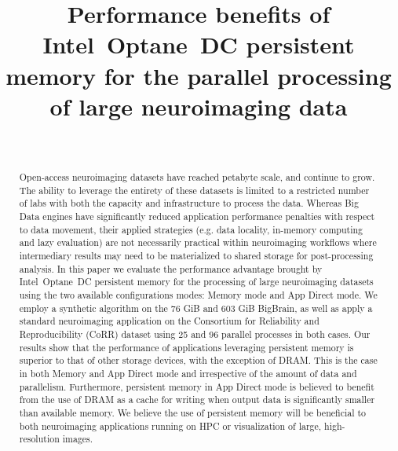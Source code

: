 \documentclass[conference]{IEEEtran}
\begin{document}
\title{Performance benefits of Intel\textsuperscript{\textregistered}~Optane\texttrademark~DC persistent memory for the parallel processing of large neuroimaging data}

\author{\\
}
\maketitle

\begin{abstract}
    Open-access neuroimaging datasets have reached petabyte scale, and continue to grow.
The ability to leverage the entirety of these datasets is limited to a restricted
number of labs with both the capacity and infrastructure to
process the data. Whereas Big Data engines have significantly
reduced application performance penalties with respect to data
movement, their applied strategies (e.g. data locality, in-memory computing and lazy evaluation)
are not necessarily practical
within neuroimaging workflows where intermediary results may
need to be materialized to shared storage for post-processing
analysis. In this paper we evaluate the performance advantage
brought by Intel\textsuperscript{\textregistered}~Optane\texttrademark~DC persistent memory for the
processing of large neuroimaging datasets using the two available
configurations modes: Memory mode and App Direct mode. We
employ a synthetic algorithm on the 76 GiB and 603 GiB BigBrain, as well as apply a
standard neuroimaging application on the Consortium for Reliability
and Reproducibility (CoRR) dataset using 25 and 96 parallel
processes in both cases. Our results show that the performance of
applications leveraging persistent memory is superior to that of other
storage devices, with the exception of DRAM. This is the case
in both Memory and App Direct mode and irrespective of the
amount of data and parallelism. Furthermore, persistent memory in App
Direct mode is believed to benefit from the use of DRAM as
a cache for writing when output data is significantly
smaller than available memory. We believe the use of persistent memory
will be beneficial to both neuroimaging applications running on
HPC or visualization of large, high-resolution images.
\end{abstract}
\end{document}
